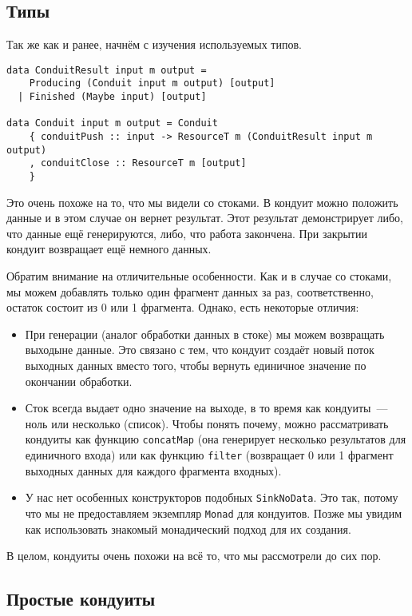 {\subsection{Типы}
Так же как и ранее, начнём с изучения используемых типов.
\begin{lstlisting}
data ConduitResult input m output =
    Producing (Conduit input m output) [output]
  | Finished (Maybe input) [output]

data Conduit input m output = Conduit
    { conduitPush :: input -> ResourceT m (ConduitResult input m output)
    , conduitClose :: ResourceT m [output]
    }
\end{lstlisting}
Это очень похоже на то, что мы видели со стоками. В кондуит можно положить данные и в этом
случае он вернет результат. Этот результат демонстрирует либо, что данные ещё
генерируются, либо, что работа закончена. При закрытии кондуит возвращает ещё немного данных.

Обратим внимание на отличительные особенности. Как и в случае со стоками, мы можем
добавлять только один фрагмент данных за раз, соответственно, остаток состоит из 0 или 1 фрагмента.
Однако, есть некоторые отличия:

\begin{itemize}  
\item При генерации (аналог обработки данных в стоке) мы можем возвращать выходыне данные.
Это связано с тем, что кондуит создаёт новый поток выходных данных вместо того, чтобы вернуть единичное значение по окончании обработки.
\item Сток всегда выдает одно значение на выходе, в то время как кондуиты~--- ноль или 
несколько (список). Чтобы понять почему, можно рассматривать кондуиты как функцию
\lstinline'concatMap' (она генерирует несколько результатов для единичного входа)
или как функцию \lstinline'filter' (возвращает 0 или 1 фрагмент выходных данных для каждого фрагмента входных).
\item У нас нет особенных конструкторов подобных \lstinline'SinkNoData'. Это так, потому что мы не
предоставляем
экземпляр \lstinline'Monad' для кондуитов. Позже мы увидим как использовать знакомый 
монадический подход для их создания.
\end{itemize}  
В целом, кондуиты очень похожи на всё то, что мы рассмотрели до сих пор.

\subsection{Простые кондуиты}

}

